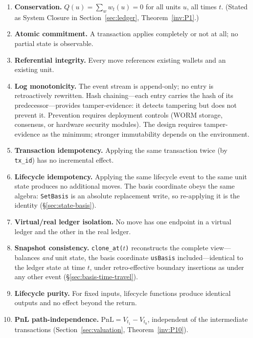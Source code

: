 \begin{enumerate}
\item[\textbf{P1}] \textbf{Conservation.} $Q(u)=\sum_w w_t(u)=0$ for all units $u$, all times $t$. (Stated as System Closure in Section~\ref{sec:ledger}, Theorem~\ref{inv:P1}.)
\item[\textbf{P2}] \textbf{Atomic commitment.}\label{inv:P2} A transaction applies completely or not at all; no partial state is observable.
\item[\textbf{P3}] \textbf{Referential integrity.}\label{inv:P3} Every move references existing wallets and an existing unit.
\item[\textbf{P4}] \textbf{Log monotonicity.}\label{inv:P4} The event stream is append-only; no entry is retroactively rewritten. Hash chaining---each entry carries the hash of its predecessor---provides tamper-evidence: it detects tampering but does not prevent it. Prevention requires deployment controls (WORM storage, consensus, or hardware security modules). The design requires tamper-evidence as the minimum; stronger immutability depends on the environment.
\item[\textbf{P5}] \textbf{Transaction idempotency.}\label{inv:P5} Applying the same transaction twice (by \texttt{tx\_id}) has no incremental effect.
\item[\textbf{P6}] \textbf{Lifecycle idempotency.}\label{inv:P6} Applying the same lifecycle event to the same unit state produces no additional moves. The basis coordinate obeys the same algebra: \texttt{SetBasis} is an absolute replacement write, so re-applying it is the identity (\S\ref{sec:state-basis}).
\item[\textbf{P7}] \textbf{Virtual/real ledger isolation.}\label{inv:P7} No move has one endpoint in a virtual ledger and the other in the real ledger.
\item[\textbf{P8}] \textbf{Snapshot consistency.}\label{inv:P8} \texttt{clone\_at($t$)} reconstructs the complete view---balances \emph{and} unit state, the basis coordinate \texttt{usBasis} included---identical to the ledger state at time $t$, under retro-effective boundary insertions as under any other event (\S\ref{sec:basis-time-travel}).
\item[\textbf{P9}] \textbf{Lifecycle purity.}\label{inv:P9} For fixed inputs, lifecycle functions produce identical outputs and no effect beyond the return.
\item[\textbf{P10}] \textbf{PnL path-independence.} $\mathrm{PnL}=V_{t_1}-V_{t_0}$, independent of the intermediate transactions (Section~\ref{sec:valuation}, Theorem~\ref{inv:P10}).
\end{enumerate}

